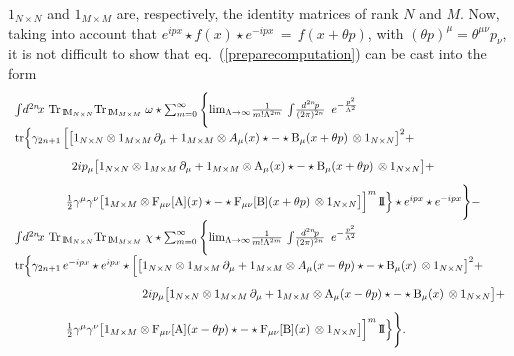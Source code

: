 \documentclass[a4paper,12pt]{article}
\def\A{{\rm A}}
\def\B{{\rm B}}
\def\idpn{\int\! \frac{d^{2n}\!p}{(2\pi)^{2n}} \,\,}
\def\idxn{\int\! d^{2n}\!x \,}
\def\ot{\otimes}
\def\MM{{\rm I\!\!\, M}}
\def\unit{{\rm I\!\!\, I}}
\begin{document}
$1_{N\times N}$ and $1_{M\times M}$ are, respectively, the identity matrices 
of rank $N$ and $M$. Now, taking into  account that 
$
e^{ipx}\star f(x)\star e^{-ipx}\,=\,f(x+\theta p)$,
with $(\theta p)^{\mu}=\theta^{\mu\nu}p_{\nu}$, it is not difficult to show 
that eq.~(\ref{preparecomputation}) can be cast into the form
\begin{equation}
\begin{array}{l}
{\idxn\,{\rm Tr}_{\,\MM_{N\times N}}{\rm Tr}_{\,\MM_{M\times M}} \;
\omega\star\sum_{m=0}^{\infty}\Bigg\{ 
\mbox{lim}_{\Lambda\rightarrow\infty}\frac{1}{m!\Lambda^{2m}} 
\,\idpn\,e^{-\frac{p^2}{\Lambda^2}}}\\[9pt]
{{\rm tr}\Big\{\gamma_{2n+1}\,\Big[\big[1_{N\times N}\ot 1_{M\times M}\,
\partial_{\mu}+1_{M\times M}\ot A_{\mu}(x)\star -
\star\B_{\mu}(x+\theta p)\,\ot 1_{N\times N}\big]^2+}\\[9pt]
{\phantom{{\rm tr}\Big\{\gamma_{2n+1}\,\Big[\;}2ip_{\mu}
\big[1_{N\times N}\ot 1_{M\times M}\,
\partial_{\mu}+1_{M\times M}\ot\A_{\mu}(x)\star -
\star\B_{\mu}(x+\theta p)\,\ot 1_{N\times N}\big]+}\\[9pt]
{\phantom{\Big\{\gamma_{2n+1}\,\Big[[\;}\frac{1}{2}
\gamma^{\mu}\gamma^{\nu}\big[1_{M\times M}\ot {\rm F}_{\mu\nu}[\A](x)\star- \star{\rm F}_{\mu\nu}[\B](x+\theta p)\,\ot 1_{N\times N}
\big]\Big]^m\,\unit\Big\}\star e^{ipx}
\star e^{-ipx}\Bigg\}-}\\[9pt]
{\idxn\,{\rm Tr}_{\,\MM_{N\times N}}{\rm Tr}_{\,\MM_{M\times M}} \;
\chi\star\sum_{m=0}^{\infty}\Bigg\{
\mbox{lim}_{\Lambda\rightarrow\infty}\frac{1}{m!\Lambda^{2m}}  
\,\idpn\,e^{-\frac{p^2}{\Lambda^2}}}\\[9pt]
{{\rm tr}\Big\{\gamma_{2n+1}\, e^{-ipx}\star e^{ipx}\star
\Big[\big[1_{N\times N}\ot 1_{M\times M}\,\partial_{\mu}+ 1_{M\times M}\ot A_{\mu}(x-\theta p)\star -\star\B_{\mu}(x)\,\ot 1_{N\times N}\big]^2+}\\[9pt]
{\phantom{{\rm tr}\Big\{\gamma_{2n+1}\, e^{-ipx}\star e^{ipx}\star
\Big[\big[} 2ip_{\mu}\big[1_{N\times N}\ot 1_{M\times M}\,
\partial_{\mu}+ 1_{M\times M}\ot \A_{\mu}(x-\theta p)\star -
\star\B_{\mu}(x)\,\ot 1_{N\times N}\big]+}\\[9pt]
{\phantom{\Big\{\gamma_{2n+1}\,\Big[[\;}\frac{1}{2}
\gamma^{\mu}\gamma^{\nu}\big[1_{M\times M}\ot {\rm F}_{\mu\nu}[\A](x-\theta p)\star- \star{\rm F}_{\mu\nu}[\B](x)\,\ot 1_{N\times N}\big]\Big]^m\,\unit\Big\}\Bigg\}.}\\[9pt]
\end{array}
\end{equation}
\end{document}
